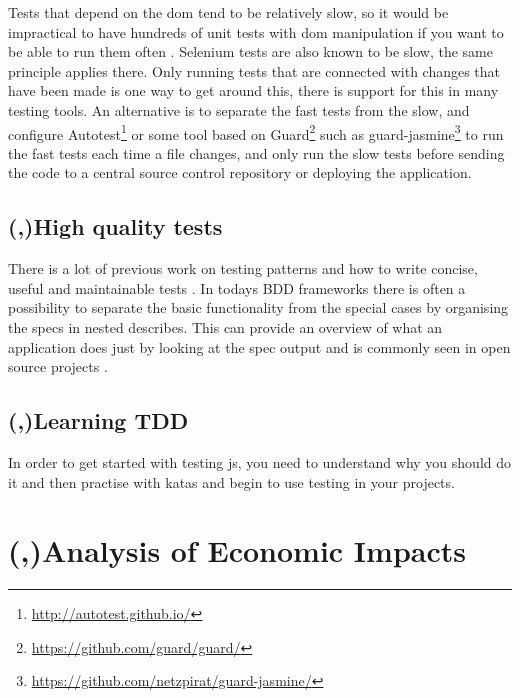 \documentclass[11pt]{article}
\begin{document}
Tests that depend on the \gls{dom} tend to be relatively slow, so it would be impractical to have hundreds of unit tests with \gls{dom} manipulation if you want to be able to run them often \cite[questions~21-22]{Stenmark}. Selenium tests are also known to be slow, the same principle applies there. Only running tests that are connected with changes that have been made is one way to get around this, there is support for this in many testing tools. An alternative is to separate the fast tests from the slow, and configure Autotest\footnote{\url{http://autotest.github.io/}} or some tool based on Guard\footnote{\url{https://github.com/guard/guard/}} such as guard-jasmine\footnote{\url{https://github.com/netzpirat/guard-jasmine/}} to run the fast tests each time a file changes, and only run the slow tests before sending the code to a central source control repository or deploying the application.

\subsection{(,)High quality tests}
\label{HighQuality}

There is a lot of previous work on testing patterns and how to write concise, useful and maintainable tests \cite[part~III]{TestPatterns}\cite[ch.~3-5]{BDDJS}\cite[p.~461-474]{Tddjs}\cite[p.~86-87]{TestableJS}\cite[p.~13-14]{JasmineBook}. In todays BDD frameworks there is often a possibility to separate the basic functionality from the special cases by organising the specs in nested describes. This can provide an overview of what an application does just by looking at the spec output and is commonly seen in open source projects \cite[question~42]{Stenmark}.

\subsection{(,)Learning TDD}

In order to get started with testing \gls{js}, you need to understand why you should do it \cite[question~38]{Edelstam} and then practise with katas and begin to use testing in your projects.

\section{(,)Analysis of Economic Impacts}
\end{document}
